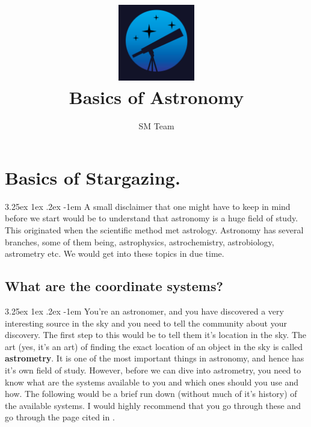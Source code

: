 \documentclass[a4paper,twoside,11pt]{article}
\title{\includegraphics[width=0.25\textwidth]{Stargazing_Mumbai_LOGO1.jpg} \\ Basics of Astronomy}
\author{SM Team}
\makeatletter
\numberwithin{equation}{section}
\renewcommand\paragraph{\@startsection{paragraph}{5}{\z@}%
  {3.25ex \@plus1ex \@minus.2ex}%
  {-1em}%
  {\normalfont\normalsize\bfseries}}
\makeatother
\begin{document}
\maketitle
\tableofcontents
\newpage
\section{Basics of Stargazing.}
\paragraph{}
A small disclaimer that one might have to keep in mind before we start would be to understand that astronomy is a huge field of study. This originated when the scientific method met astrology. Astronomy has several branches, some of them being, astrophysics, astrochemistry, astrobiology, astrometry etc. We would get into these topics in due time.

\subsection{What are the coordinate systems?}
\paragraph{}
You're an astronomer, and you have discovered a very interesting source in the sky and you need to tell the community about your discovery. The first step to this would be to tell them it's location in the sky. The art (yes, it's an art) of finding the exact location of an object in the sky is called \textbf{astrometry}. It is one of the most important things in astronomy, and hence has it's own field of study. However, before we can dive into astrometry, you need to know what are the systems available to you and which ones should you use and how. The following would be a brief run down (without much of it's history) of the available systems. I would highly recommend that you go through these and go through the page cited in \cite{astrometry_wiki}. 
\end{document}
